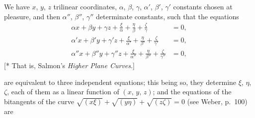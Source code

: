 \documentclass[11pt]{article}
\begin{document}
We have $x$, $y$, $z$ trilinear coordinates,
$\alpha$, $\beta$, $\gamma$, $\alpha'$, $\beta'$, $\gamma'$ constants chosen
at pleasure, and then $\alpha''$, $\beta''$, $\gamma''$ determinate constants,
such that the equations
\begin{align*}
  \alpha x + \beta y + \gamma z + \tfrac{\xi}{\alpha} + \tfrac{\eta}{\beta} + \tfrac{\zeta}{\gamma} &= 0,\\
  \alpha' x + \beta' y + \gamma' z + \tfrac{\xi}{\alpha'} + \tfrac{\eta}{\beta'} + \tfrac{\zeta}{\gamma'} &= 0,\\
  \alpha'' x + \beta'' y + \gamma'' z + \tfrac{\xi}{\alpha''} + \tfrac{\eta}{\beta''} + \tfrac{\zeta}{\gamma''} &= 0,
\end{align*}
\noindent\footnotesize[* That is, Salmon's \emph{Higher Plane Curves}.]\normalsize

\bigskip
\noindent
are equivalent to three independent equations; this being so, they determine
$\xi$, $\eta$, $\zeta$, each of them as a linear function of $(x,\, y,\, z)$;
and the equations of the bitangents of the curve
$\sqrt{(x\xi)} + \sqrt{(y\eta)} + \sqrt{(z\zeta)} = 0$ (see Weber, p.\ 100) are
\end{document}
